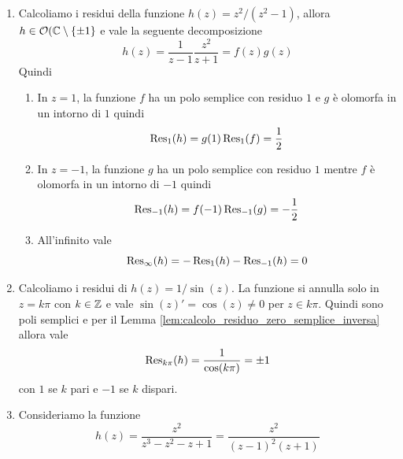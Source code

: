 \begin{example}
  \begin{enumerate}
    \item Calcoliamo i residui della funzione $h(z) = z^2 / (z^2 - 1)$, allora $h
        \in \mathcal{O}(\mathbb{C} \setminus \left\{ \pm 1 \right\}$ e vale la seguente
         decomposizione
         \begin{equation*}
            h(z) = \frac{1}{z-1} \frac{z^2}{z+1} = f(z)g(z)
         \end{equation*}
         Quindi 
         \begin{enumerate}
            \item In $z = 1$, la funzione $f$ ha un polo semplice con residuo $1$ e $g$
                è olomorfa in un intorno di $1$ quindi 
                \begin{equation*}
                    \operatorname{Res}_1(h) = g(1) \operatorname{Res}_1(f) = \frac{1}{2}
                \end{equation*}
            \item In $z = -1$, la funzione $g$ ha un polo semplice con residuo $1$
                mentre $f$ è olomorfa in un intorno di $-1$ quindi 
                \begin{equation*}
                    \operatorname{Res}_{-1}(h) = f(-1) \operatorname{Res}_{-1}(g) = - \frac{1}{2}
                \end{equation*}
            \item All'infinito vale 
                \begin{equation*}
                    \operatorname{Res}_\infty(h) = - \operatorname{Res}_{1}(h) - \operatorname{Res}_{-1}(h) = 0
                \end{equation*}
         \end{enumerate}
       \item Calcoliamo i residui di $h(z) = 1/ \sin(z)$. La funzione si annulla
         solo in $z = k\pi$ con $k \in \mathbb{Z}$ e vale $\sin(z)' = \cos(z) \neq 0$
         per $z \in k \pi$. Quindi sono poli semplici e per il Lemma
         \ref{lem:calcolo_residuo_zero_semplice_inversa} allora vale 
         \begin{equation*}
           \operatorname{Res}_{k\pi}(h) = \frac{1}{\cos(k\pi)} = \pm 1
         \end{equation*}
         con $1$ se $k$ pari e $-1$ se $k$ dispari.
       \item Consideriamo la funzione 
         \begin{equation*}
           h(z) = \frac{z^2}{z^3 - z^2 - z + 1} = \frac{z^2}{(z-1)^2(z+1)}
         \end{equation*}

\end{enumerate}
\end{example}
